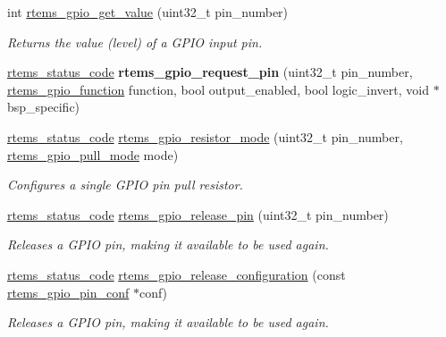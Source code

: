 \begin{DoxyCompactItemize}
int \mbox{\hyperlink{gpio-support_8c_a5edaeced56e5e7124ec4eb33cfb51867}{rtems\+\_\+gpio\+\_\+get\+\_\+value}} (uint32\+\_\+t pin\+\_\+number)
\begin{DoxyCompactList}\small\item\em Returns the value (level) of a G\+P\+IO input pin. \end{DoxyCompactList}\item 
\mbox{\label{gpio-support_8c_a5d6bcd316137b2baddac679526033bec}} 
\mbox{\hyperlink{group__ClassicStatus_ga545d41846817eaba6143d52ee4d9e9fe}{rtems\+\_\+status\+\_\+code}} {\bfseries rtems\+\_\+gpio\+\_\+request\+\_\+pin} (uint32\+\_\+t pin\+\_\+number, \mbox{\hyperlink{gpio_8h_a0dec0f66d467b092b41dafe3d731a0d1}{rtems\+\_\+gpio\+\_\+function}} function, bool output\+\_\+enabled, bool logic\+\_\+invert, void $\ast$bsp\+\_\+specific)
\item 
\mbox{\hyperlink{group__ClassicStatus_ga545d41846817eaba6143d52ee4d9e9fe}{rtems\+\_\+status\+\_\+code}} \mbox{\hyperlink{gpio-support_8c_a013e4e3b5af6755d8a40000e297c1251}{rtems\+\_\+gpio\+\_\+resistor\+\_\+mode}} (uint32\+\_\+t pin\+\_\+number, \mbox{\hyperlink{gpio_8h_add28697559b41893e0754f35509bf835}{rtems\+\_\+gpio\+\_\+pull\+\_\+mode}} mode)
\begin{DoxyCompactList}\small\item\em Configures a single G\+P\+IO pin pull resistor. \end{DoxyCompactList}\item 
\mbox{\hyperlink{group__ClassicStatus_ga545d41846817eaba6143d52ee4d9e9fe}{rtems\+\_\+status\+\_\+code}} \mbox{\hyperlink{gpio-support_8c_a365b5cf4bcbb396316f2d99569ad95ec}{rtems\+\_\+gpio\+\_\+release\+\_\+pin}} (uint32\+\_\+t pin\+\_\+number)
\begin{DoxyCompactList}\small\item\em Releases a G\+P\+IO pin, making it available to be used again. \end{DoxyCompactList}\item 
\mbox{\hyperlink{group__ClassicStatus_ga545d41846817eaba6143d52ee4d9e9fe}{rtems\+\_\+status\+\_\+code}} \mbox{\hyperlink{gpio-support_8c_ae2da05d49ec0e6f367f1f93b343f0673}{rtems\+\_\+gpio\+\_\+release\+\_\+configuration}} (const \mbox{\hyperlink{structrtems__gpio__pin__conf}{rtems\+\_\+gpio\+\_\+pin\+\_\+conf}} $\ast$conf)
\begin{DoxyCompactList}\small\item\em Releases a G\+P\+IO pin, making it available to be used again. \end{DoxyCompactList}\item 

\end{DoxyCompactItemize}
